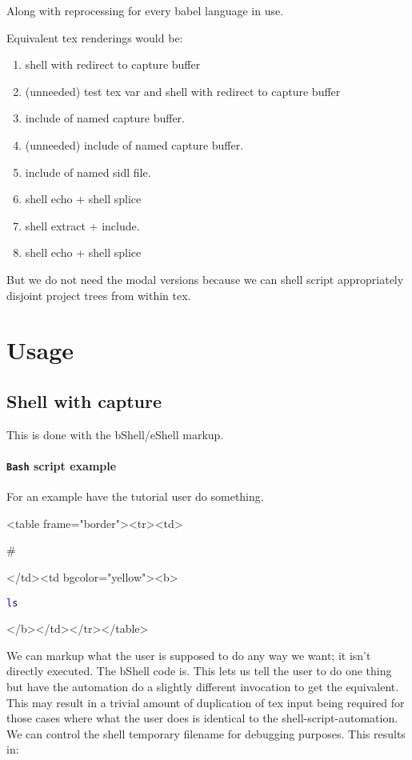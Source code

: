 \documentclass{article}
\def\prompt{\#}
\def\usershell#1{\larger \prompt \framebox{\texttt{\textcolor{Blue}{#1}}} \smaller }
\providecommand{\bShell}[2][]{}
\def\usershell#1{\begin{rawhtml}<table frame="border"><tr><td>\end{rawhtml}\prompt \begin{rawhtml}</td><td bgcolor="yellow"><b>\end{rawhtml}{\texttt{\textcolor{Blue}{#1}}}\begin{rawhtml}</b></td></tr></table>\end{rawhtml} }
\begin{document}
Along with reprocessing for every babel language in use.

Equivalent tex renderings would be:
\begin{enumerate}
\item shell with redirect to capture buffer
\item (unneeded) test tex var and shell with redirect to capture buffer
\item include of named capture buffer.
\item (unneeded) include of named capture buffer.
\item include of named sidl file.
\item shell echo + shell splice
\item shell extract + include.
\item shell echo + shell splice
\end{enumerate}
But we do not need the modal versions because we can shell script
appropriately disjoint project trees from within tex.

\section{Usage}
\label{sec:usage}
\subsection{Shell with capture}
\label{sec:shell}
This is done with the bShell/eShell markup.
\paragraph{\texttt{Bash} script example}
For an example have the tutorial user do something.

\usershell{ls}

We can markup what the user is supposed to do any way we want;
it isn't directly executed. The bShell code is. This
lets us tell the user to do one thing but have the automation
do a slightly different invocation to get the equivalent.
This may result in a trivial amount of duplication of tex
input being required for those cases where what the user does
is identical to the shell-script-automation.
We can control the shell temporary filename for debugging purposes.
This results in:

\def\tobiShellFileName{tmp/first.sh}
\end{document}
